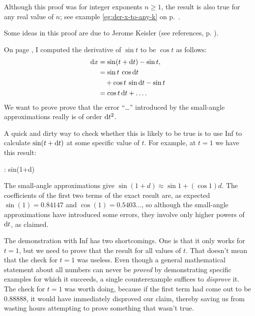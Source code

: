 Although this proof was for integer exponents $n\ge 1$, the result is also true for any
real value of $n$; see example \ref{eg:der-x-to-any-k}
on p.~\pageref{eg:der-x-to-any-k}.


Some ideas in this proof are due to Jerome Keisler (see references, p. \pageref{references}).

On page \pageref{eg:derivative-of-sin}, I computed the derivative of $\sin t$ to be $\cos t$
as follows:
\begin{align*}
  \operatorname{d\!} x &= \sin(t+\operatorname{d\!} t)-\sin t, \\
         &= \sin t \: \cos \operatorname{d\!} t \\
         &\quad + \cos t \: \sin \operatorname{d\!} t - \sin t \\
         &= \cos t \operatorname{d\!} t + \ldots.
\end{align*}
We want to prove prove that the error ``\ldots'' introduced by the small-angle approximations really
is of order $\operatorname{d\!} t^2$. 

A quick and dirty way to check whether this is likely to be true is to
use Inf to calculate $\sin(t+\operatorname{d\!} t)$ at some specific value of $t$. For example, at $t=1$ we have
this result:
\begin{Code}
  \ii : sin(1+d)
\end{Code}
The small-angle approximations give $\sin(1+d)\approx\sin 1+(\cos 1)d$.
The coefficients of the first two terms of the exact result are, as expected $\sin(1)=0.84147$ and $\cos(1)=0.5403\ldots$, so although the
small-angle approximations have introduced some errors, they involve only higher powers of $\operatorname{d\!} t$, as claimed.

The demonstration with Inf has two shortcomings. One is that it only works for $t=1$, but we need to
prove that the result for all values of $t$. That doesn't mean that the check for $t=1$ was useless.
Even though a general mathematical statement about all numbers can never be \emph{proved} by demonstrating
specific examples for which it succeeds, a single counterexample suffices to \emph{disprove} it.
The check for $t=1$ was worth doing, because if the first term had come out to be
0.88888, it would have immediately disproved our claim, thereby
saving us from wasting hours attempting to prove something that wasn't true.

